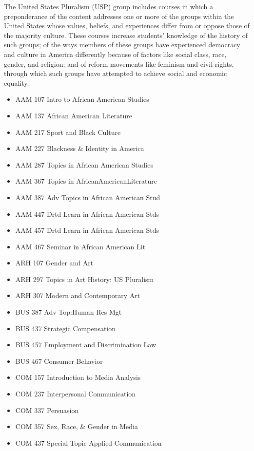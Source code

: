 \documentclass[
  letterpaper,
]{scrbook}
\providecommand{\tightlist}{%
  \setlength{\itemsep}{0pt}\setlength{\parskip}{0pt}}
\begin{document}
The United States Pluralism (USP) group includes courses in which a
preponderance of the content addresses one or more of the groups within
the United States whose values, beliefs, and experiences differ from or
oppose those of the majority culture. These courses increase students'
knowledge of the history of such groups; of the ways members of these
groups have experienced democracy and culture in America differently
because of factors like social class, race, gender, and religion; and of
reform movements like feminism and civil rights, through which such
groups have attempted to achieve social and economic equality.

\begin{itemize}
\tightlist
\item
  AAM 107 Intro to African American Studies
\item
  AAM 137 African American Literature
\item
  AAM 217 Sport and Black Culture
\item
  AAM 227 Blackness \& Identity in America
\item
  AAM 287 Topics in African American Studies
\item
  AAM 367 Topics in AfricanAmericanLiterature
\item
  AAM 387 Adv Topics in African American Stud
\item
  AAM 447 Drtd Learn in African American Stds
\item
  AAM 457 Drtd Learn in African American Stds
\item
  AAM 467 Seminar in African American Lit
\item
  ARH 107 Gender and Art
\item
  ARH 297 Topics in Art History: US Pluralism
\item
  ARH 307 Modern and Contemporary Art
\item
  BUS 387 Adv Top:Human Res Mgt
\item
  BUS 437 Strategic Compensation
\item
  BUS 457 Employment and Discrimination Law
\item
  BUS 467 Consumer Behavior
\item
  COM 157 Introduction to Media Analysis
\item
  COM 237 Interpersonal Communication
\item
  COM 337 Persuasion
\item
  COM 357 Sex, Race, \& Gender in Media
\item
  COM 437 Special Topic Applied Communication

\end{itemize}
\end{document}
